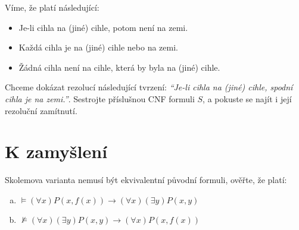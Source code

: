 \medskip\begin{problem} Víme, že platí následující:
    \begin{itemize}\it
        \item Je-li cihla na (jiné) cihle, potom není na zemi.
        \item Každá cihla je na (jiné) cihle nebo na zemi.
        \item Žádná cihla není na cihle, která by byla na (jiné) cihle.
    \end{itemize}
    Chceme dokázat rezolucí následující tvrzení: {\it ``Je-li cihla na (jiné) cihle, spodní cihla je na zemi.''}. Sestrojte příslušnou CNF formuli $S$, a pokuste se najít i její rezoluční zamítnutí.
\end{problem}

        
\section*{K zamyšlení}

    
\begin{problem} 
    
    Skolemova varianta nemusí být ekvivalentní původní formuli, ověřte, že platí:
    \begin{enumerate}[(a)]
        \item $\models (\forall x)P(x,f(x)) \to (\forall x)(\exists y)P(x,y)$
        \item $\not\models (\forall x)(\exists y)P(x,y)\to (\forall x)P(x,f(x))$
    \end{enumerate}

\end{problem}















 


